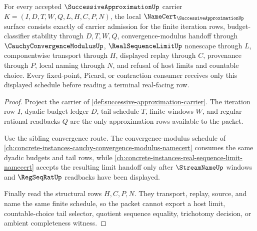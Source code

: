 \begin{theorem}
\label{thm:successive-approximation-namecert-obligations}
For every accepted $\SuccessiveApproximationUp$ carrier $K=(I,D,T,W,Q,L,H,C,P,N)$, the local $\NameCert_{\SuccessiveApproximationUp}$ surface consists exactly of carrier admission for the finite iteration rows, budget-classifier stability through $D,T,W,Q$, convergence-modulus handoff through $\CauchyConvergenceModulusUp$, $\RealSequenceLimitUp$ nonescape through $L$, componentwise transport through $H$, displayed replay through $C$, provenance through $P$, local naming through $N$, and refusal of host limits and countable choice. Every fixed-point, Picard, or contraction consumer receives only this displayed schedule before reading a terminal real-facing row.
\end{theorem}
\begin{proof}
Project the carrier of \autoref{def:successive-approximation-carrier}. The iteration row $I$, dyadic budget ledger $D$, tail schedule $T$, finite windows $W$, and regular rational readbacks $Q$ are the only approximation rows available to the packet.

Use the sibling convergence route. The convergence-modulus schedule of \autoref{ch:concrete-instances-cauchy-convergence-modulus-namecert} consumes the same dyadic budgets and tail rows, while \autoref{ch:concrete-instances-real-sequence-limit-namecert} accepts the resulting limit handoff only after $\StreamNameUp$ windows and $\RegSeqRatUp$ readbacks have been displayed.

Finally read the structural rows $H,C,P,N$. They transport, replay, source, and name the same finite schedule, so the packet cannot export a host limit, countable-choice tail selector, quotient sequence equality, trichotomy decision, or ambient completeness witness.
\end{proof}



